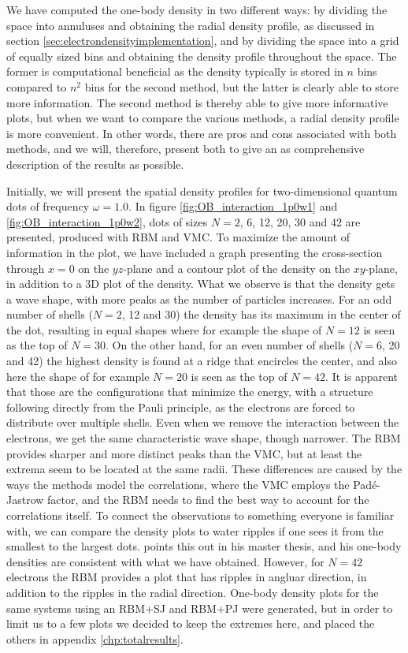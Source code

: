 We have computed the one-body density in two different ways: by dividing the space into annuluses and obtaining the radial density profile, as discussed in section \ref{sec:electrondensityimplementation}, and by dividing the space into a grid of equally sized bins and obtaining the density profile throughout the space. The former is computational beneficial as the density typically is stored in $n$ bins compared to $n^2$ bins for the second method, but the latter is clearly able to store more information. The second method is thereby able to give more informative plots, but when we want to compare the various methods, a radial density profile is more convenient. In other words, there are pros and cons associated with both methods, and we will, therefore, present both to give an as comprehensive description of the results as possible. 

Initially, we will present the spatial density profiles for two-dimensional quantum dots of frequency $\omega=1.0$. In figure \eqref{fig:OB_interaction_1p0w1} and \eqref{fig:OB_interaction_1p0w2}, dots of sizes $N=2$, 6, 12, 20, 30 and 42 are presented, produced with RBM and VMC. To maximize the amount of information in the plot, we have included a graph presenting the cross-section through $x=0$ on the $yz$-plane and a contour plot of the density on the $xy$-plane, in addition to a 3D plot of the density. What we observe is that the density gets a wave shape, with more peaks as the number of particles increases. For an odd number of shells ($N=2$, 12 and 30) the density has its maximum in the center of the dot, resulting in equal shapes where for example the shape of $N=12$ is seen as the top of $N=30$. On the other hand, for an even number of shells ($N=6$, 20 and 42) the highest density is found at a ridge that encircles the center, and also here the shape of for example $N=20$ is seen as the top of $N=42$. It is apparent that those are the configurations that minimize the energy, with a structure following directly from the Pauli principle, as the electrons are forced to distribute over multiple shells. Even when we remove the interaction between the electrons, we get the same characteristic wave shape, though narrower. The RBM provides sharper and more distinct peaks than the VMC, but at least the extrema seem to be located at the same radii. These differences are caused by the ways the methods model the correlations, where the VMC employs the Padé-Jastrow factor, and the RBM needs to find the best way to account for the correlations itself. To connect the observations to something everyone is familiar with, we can compare the density plots to water ripples if one sees it from the smallest to the largest dots. \citet{hogberget_quantum_2013} points this out in his master thesis, and his one-body densities are consistent with what we have obtained. However, for $N=42$ electrons the RBM provides a plot that has ripples in angluar direction, in addition to the ripples in the radial direction. One-body density plots for the same systems using an RBM+SJ and RBM+PJ were generated, but in order to limit us to a few plots we decided to keep the extremes here, and placed the others in appendix \ref{chp:totalresults}.

